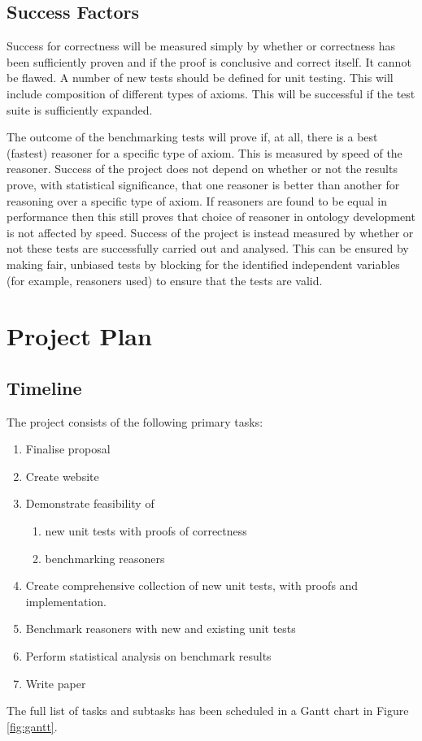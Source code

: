 \documentclass[draft]{sig-alternate}
\begin{document}
\subsection{Success Factors}

Success for correctness will be measured simply by whether or correctness has been sufficiently proven and if the proof is conclusive and correct itself. It cannot be flawed. A number of new tests should be defined for unit testing. This will include composition of different types of axioms. This will be successful if the test suite is sufficiently expanded.

The outcome of the benchmarking tests will prove if, at all, there is a best (fastest) reasoner for a specific type of axiom. This is measured by speed of the reasoner. Success of the project does not depend on whether or not the results prove, with statistical significance, that one reasoner is better than another for reasoning over a specific type of axiom. If reasoners are found to be equal in performance then this still proves that choice of reasoner in ontology development is not affected by speed. Success of the project is instead measured by whether or not these tests are successfully carried out and analysed. This can be ensured by making fair, unbiased tests by blocking for the identified independent variables (for example, reasoners used) to ensure that the tests are valid.


\section{Project Plan}

\subsection{Timeline}

The project consists of the following primary tasks:
\begin{enumerate}[noitemsep]
  \item Finalise proposal
  \item Create website
  \item Demonstrate feasibility of
  \begin{enumerate}[nosep]
    \item new unit tests with proofs of correctness
    \item benchmarking reasoners
  \end{enumerate}
  \item Create comprehensive collection of new unit tests, with proofs and implementation.
  \item Benchmark reasoners with new and existing unit tests
  \item Perform statistical analysis on benchmark results
  \item Write paper
\end{enumerate}
The full list of tasks and subtasks has been scheduled in a Gantt chart in Figure \ref{fig:gantt}.
\end{document}
